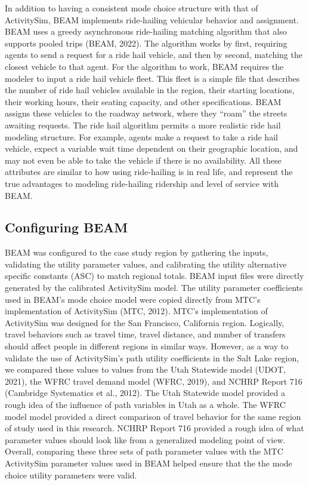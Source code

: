 \documentclass[fancy, masters]{byuthesis}
\begin{document}
In addition to having a consistent mode choice structure with that of ActivitySim, BEAM implements ride-hailing vehicular behavior and assignment. BEAM uses a greedy asynchronous ride-hailing matching algorithm that also supports pooled trips (BEAM, 2022). The algorithm works by first, requiring agents to send a request for a ride hail vehicle, and then by second, matching the closest vehicle to that agent. For the algorithm to work, BEAM requires the modeler to input a ride hail vehicle fleet. This fleet is a simple file that describes the number of ride hail vehicles available in the region, their starting locations, their working hours, their seating capacity, and other specifications. BEAM assigns these vehicles to the roadway network, where they ``roam'' the streets awaiting requests. The ride hail algorithm permits a more realistic ride hail modeling structure. For example, agents make a request to take a ride hail vehicle, expect a variable wait time dependent on their geographic location, and may not even be able to take the vehicle if there is no availability. All these attributes are similar to how using ride-hailing is in real life, and represent the true advantages to modeling ride-hailing ridership and level of service with BEAM.

\hypertarget{configuring-beam}{%
\subsection{Configuring BEAM}\label{configuring-beam}}

BEAM was configured to the case study region by gathering the inputs, validating the utility parameter values, and calibrating the utility alternative specific constants (ASC) to match regional totals. BEAM input files were directly generated by the calibrated ActivitySim model. The utility parameter coefficients used in BEAM's mode choice model were copied directly from MTC's implementation of ActivitySim (MTC, 2012). MTC's implementation of ActivitySim was designed for the San Francisco, California region. Logically, travel behaviors such as travel time, travel distance, and number of transfers should affect people in different regions in similar ways. However, as a way to validate the use of ActivitySim's path utility coefficients in the Salt Lake region, we compared these values to values from the Utah Statewide model (UDOT, 2021), the WFRC travel demand model (WFRC, 2019), and NCHRP Report 716 (Cambridge Systematics et al., 2012). The Utah Statewide model provided a rough idea of the influence of path variables in Utah as a whole. The WFRC model model provided a direct comparison of travel behavior for the same region of study used in this research. NCHRP Report 716 provided a rough idea of what parameter values should look like from a generalized modeling point of view. Overall, comparing these three sets of path parameter values with the MTC ActivitySim parameter values used in BEAM helped ensure that the the mode choice utility parameters were valid.
\end{document}
